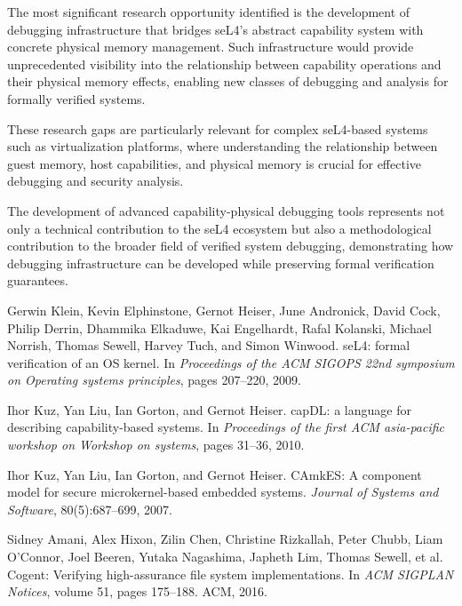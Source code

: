 \documentclass[11pt,a4paper]{article}
\begin{document}
\begin{subsubsection}
The most significant research opportunity identified is the development of debugging infrastructure that bridges seL4's abstract capability system with concrete physical memory management. Such infrastructure would provide unprecedented visibility into the relationship between capability operations and their physical memory effects, enabling new classes of debugging and analysis for formally verified systems.

These research gaps are particularly relevant for complex seL4-based systems such as virtualization platforms, where understanding the relationship between guest memory, host capabilities, and physical memory is crucial for effective debugging and security analysis.

The development of advanced capability-physical debugging tools represents not only a technical contribution to the seL4 ecosystem but also a methodological contribution to the broader field of verified system debugging, demonstrating how debugging infrastructure can be developed while preserving formal verification guarantees.


\begin{thebibliography}{10}

Gerwin Klein, Kevin Elphinstone, Gernot Heiser, June Andronick, David Cock, Philip Derrin, Dhammika Elkaduwe, Kai Engelhardt, Rafal Kolanski, Michael Norrish, Thomas Sewell, Harvey Tuch, and Simon Winwood.
\newblock seL4: formal verification of an OS kernel.
\newblock In \emph{Proceedings of the ACM SIGOPS 22nd symposium on Operating systems principles}, pages 207--220, 2009.

Ihor Kuz, Yan Liu, Ian Gorton, and Gernot Heiser.
\newblock capDL: a language for describing capability-based systems.
\newblock In \emph{Proceedings of the first ACM asia-pacific workshop on Workshop on systems}, pages 31--36, 2010.

Ihor Kuz, Yan Liu, Ian Gorton, and Gernot Heiser.
\newblock CAmkES: A component model for secure microkernel-based embedded systems.
\newblock \emph{Journal of Systems and Software}, 80(5):687--699, 2007.

Sidney Amani, Alex Hixon, Zilin Chen, Christine Rizkallah, Peter Chubb, Liam O'Connor, Joel Beeren, Yutaka Nagashima, Japheth Lim, Thomas Sewell, et al.
\newblock Cogent: Verifying high-assurance file system implementations.
\newblock In \emph{ACM SIGPLAN Notices}, volume 51, pages 175--188. ACM, 2016.


\end{thebibliography}
\end{subsubsection}
\end{document}
